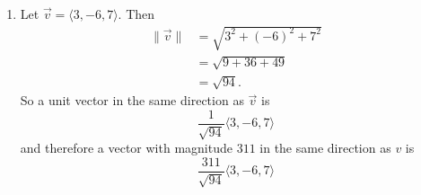\documentclass[]{ximera}
\begin{document}
\begin{problem}
\begin{freeResponse}
\begin{enumerate}
	
	
	\item  Let $\vec{v} = \langle 3,-6,7 \rangle$.  
	Then
		\begin{align*}
		\| \vec{v} \| &= \sqrt{3^2 + (-6)^2 + 7^2}  \\
		&= \sqrt{9 + 36 + 49}  \\
		&= \sqrt{94}.
		\end{align*}
	So a unit vector in the same direction as $\vec{v}$ is
		\[
		\frac{1}{\sqrt{94}} \langle 3,-6,7 \rangle
		\]
	and therefore a vector with magnitude $311$ in the same direction as $v$ is
		\[
		\boxed{\frac{311}{\sqrt{94}} \langle 3,-6,7 \rangle}
		\]
	
	\end{enumerate}
	\end{freeResponse}
	
\end{problem}

\begin{instructorNotes}

\end{instructorNotes}
\end{document}

